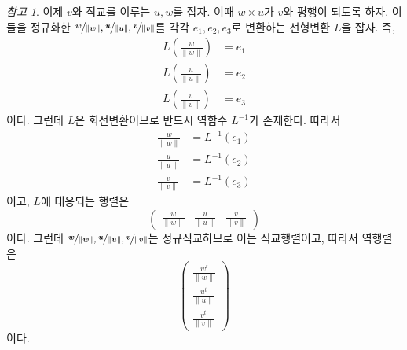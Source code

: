 \documentclass[unfonts,oneside,a4paper]{oblivoir}
\theoremstyle{definition}
\theoremstyle{theorem}
\theoremstyle{theorem}
\theoremstyle{remark}
\newtheorem*{remark}{참고}
\theoremstyle{remark}
\theoremstyle{remark}
\theoremstyle{remark}
\renewcommand{\vec}[1]{\bm{\mathit{#1}}}
\begin{document}
\begin{remark}
    이제 $\vec v$와 직교를 이루는 $\vec u, \vec w$를 잡자.
    이때 $\vec w \times \vec u$가 $\vec v$와 평행이 되도록 하자.
    이들을 정규화한 $\sfrac{\vec w}{\lVert \vec w \rVert}, \sfrac{\vec u}{\lVert \vec u \rVert}, \sfrac{\vec v}{\lVert \vec v \rVert}$를 각각 $\vec e_1, \vec e_2, \vec e_3$로 변환하는 선형변환 $L$을 잡자.
    즉,
    \begin{align*}
        L\left(\frac{\vec w}{\lVert \vec w \rVert}\right) &= \vec e_1\\
        L\left(\frac{\vec u}{\lVert \vec u \rVert}\right) &= \vec e_2\\
        L\left(\frac{\vec v}{\lVert \vec v \rVert}\right) &= \vec e_3
    \end{align*}
    이다.
    그런데 $L$은 회전변환이므로 반드시 역함수 $L^{-1}$가 존재한다.
    따라서
    \begin{align*}
        \frac{\vec w}{\lVert \vec w \rVert} &= L^{-1}(\vec e_1)\\
        \frac{\vec u}{\lVert \vec u \rVert} &= L^{-1}(\vec e_2)\\
        \frac{\vec v}{\lVert \vec v \rVert} &= L^{-1}(\vec e_3)
    \end{align*}
    이고, $L$에 대응되는 행렬은 
    \begin{equation*}
        \begin{pmatrix}
            \frac{\vec w}{\lVert \vec w \rVert} & \frac{\vec u}{\lVert \vec u \rVert} & \frac{\vec v}{\lVert \vec v \rVert}
        \end{pmatrix}
    \end{equation*}
    이다.
    그런데 $\sfrac{\vec w}{\lVert \vec w \rVert}, \sfrac{\vec u}{\lVert \vec u \rVert}, \sfrac{\vec v}{\lVert \vec v \rVert}$는 정규직교하므로 이는 직교행렬이고, 따라서 역행렬은
    \begin{equation*}
        \begin{pmatrix}
            \frac{\vec w^t}{\lVert \vec w \rVert} \\ \frac{\vec u^t}{\lVert \vec u \rVert} \\ \frac{\vec v^t}{\lVert \vec v \rVert}
        \end{pmatrix}
    \end{equation*}
    이다.


\end{remark}
\end{document}
